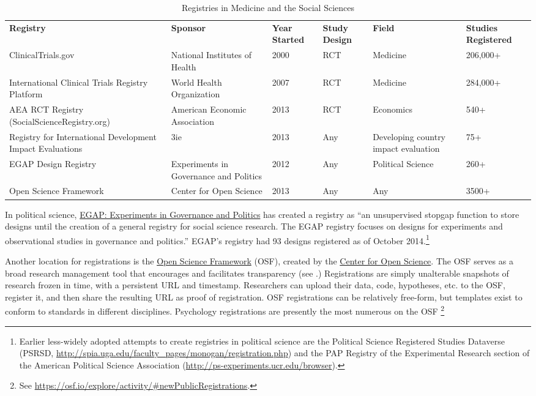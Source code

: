 \documentclass[12pt] {article}
\begin{document}
\begin{sidewaystable}[]
\centering
\caption{Registries in Medicine and the Social Sciences}
\label{RegTable}
\begin{adjustbox}{max width=\textwidth}
\begin{tabular}{llllll}
{\bf Registry} & {\bf Sponsor} & {\bf Year Started} & {\bf Study Design} & {\bf Field} & {\bf Studies Registered} \\
ClinicalTrials.gov & National Institutes of Health & 2000 & RCT & Medicine & 206,000+ \\
International Clinical Trials Registry Platform & World Health Organization & 2007 & RCT & Medicine & 284,000+ \\
AEA RCT Registry (SocialScienceRegistry.org) & American Economic Association & 2013 & RCT & Economics & 540+ \\
Registry for International Development Impact Evaluations & 3ie & 2013 & Any & Developing country impact evaluation & 75+ \\
EGAP Design Registry & Experiments in Governance and Politics & 2012 & Any & Political Science & 260+ \\
Open Science Framework & Center for Open Science & 2013 & Any & Any & 3500+
\end{tabular}
\end{adjustbox}
\end{sidewaystable}


In political science, \href{http://e-gap.org/design-registration}{EGAP: Experiments in Governance and Politics} has
created a registry as ``an unsupervised stopgap function to store
designs until the creation of a general registry for social science
research. The EGAP registry focuses on designs for experiments and
observational studies in governance and politics.'' EGAP's registry had 93
designs registered as of October 2014.\footnote{Earlier less-widely
  adopted attempts to create registries in political science are the
  Political Science Registered Studies Dataverse (PSRSD,
  \href{../customXml/item1.xml}{http://spia.uga.edu/faculty\_pages/monogan/registration.php})
  and the PAP Registry of the Experimental Research section of the
  American Political Science Association
  (\href{numbering.xml}{http://ps-experiments.ucr.edu/browser}).}

Another location for registrations is the \href{http://osf.io}{Open Science Framework} (OSF), created by the \href{http://centerforopenscience.org/}{Center for Open Science}. The OSF serves as a broad research management tool that encourages and facilitates transparency (see \cite{nosek_scientific_2012}.) Registrations are simply unalterable snapshots of research frozen in time, with a persistent URL and timestamp. Researchers can upload their data, code, hypotheses, etc. to the OSF, register it, and then share the resulting URL as proof of registration. OSF registrations can be relatively free-form, but templates exist to conform to standards in different disciplines. Psychology registrations are presently the most numerous on the OSF \footnote{See \url{https://osf.io/explore/activity/\#newPublicRegistrations}.}
\end{document}
